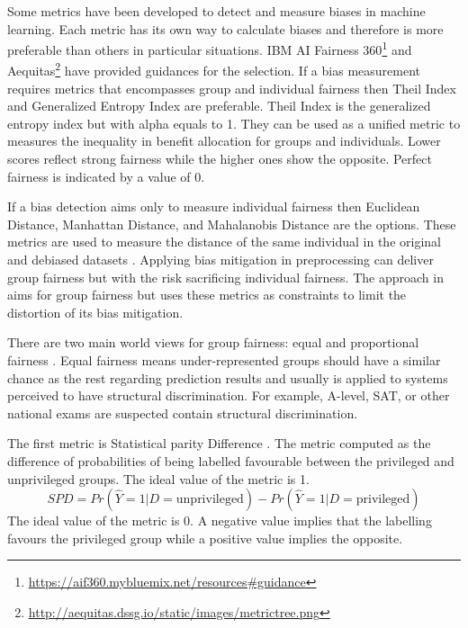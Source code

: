 \documentclass[sigconf,review]{acmart}
\begin{document}
Some metrics have been developed to detect and measure biases in machine learning. Each metric has its own way to calculate biases and therefore is more preferable than others in particular situations. IBM AI Fairness 360\footnote{\url{https://aif360.mybluemix.net/resources\#guidance}} \cite{mahoney2020ai} and Aequitas\footnote{\url{http://aequitas.dssg.io/static/images/metrictree.png}} have provided guidances for the selection. If a bias measurement requires metrics that encompasses group and individual fairness then Theil Index \cite{conceicao2000theyoung,bellamy2018ai} and Generalized Entropy Index \cite{speicher2018unified} are preferable. Theil Index is the generalized entropy index  but with alpha equals to 1. They can be used as a unified metric to measures the inequality in benefit allocation for groups and individuals. Lower scores reflect strong fairness while the higher ones show the opposite. Perfect fairness is indicated by a value of 0. 

If a bias detection aims only to measure individual fairness then Euclidean Distance, Manhattan Distance, and Mahalanobis Distance are the options. These metrics are used to measure the distance of the same individual in the original and debiased datasets \cite{bellamy2018ai}. Applying bias mitigation in preprocessing can deliver group fairness but with the risk sacrificing individual fairness. The approach in \cite{calmon2017optimized} aims for group fairness but uses these metrics as constraints to limit the distortion of its bias mitigation. 

There are two main world views for group fairness: equal and proportional fairness \cite{mahoney2020ai,bellamy2018ai}. Equal fairness means under-represented groups should have a similar chance as the rest regarding prediction results and usually is applied to systems perceived to have structural discrimination. For example, A-level, SAT, or other national exams are suspected contain structural discrimination.

The first metric is Statistical parity Difference \cite{dwork2012fairness,bellamy2018ai}. The metric computed as the difference of probabilities of being labelled favourable between the privileged and unprivileged groups. The ideal value of the metric is 1.
\begin{equation} \label{eq:1}
	SPD = Pr(\hat{Y} = 1 | D = \text{unprivileged})
	- Pr(\hat{Y} = 1 | D = \text{privileged})
\end{equation}
The ideal value of the metric is 0. A negative value implies that the labelling favours the privileged group while a positive value implies the opposite.
\end{document}
